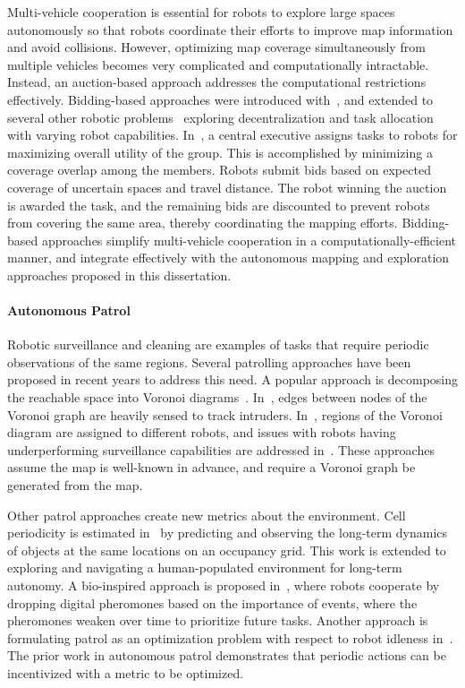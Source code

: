 \documentclass[thesis]{thesis-gwu}
\begin{document}
Multi-vehicle cooperation is essential for robots to explore large spaces autonomously so that robots coordinate their efforts to improve map information and avoid collisions. However, optimizing map coverage simultaneously from multiple vehicles becomes very complicated and computationally intractable. Instead, an auction-based approach addresses the computational restrictions effectively. Bidding-based approaches were introduced with~\cite{SimApfBurFoxMooThrYou00,DiaSte00}, and extended to several other robotic problems~\cite{GerMaj02,ZloSteDiaTha02,SarBal05,ChoBruHow09} exploring decentralization and task allocation with varying robot capabilities. In~\cite{SimApfBurFoxMooThrYou00}, a central executive assigns tasks to robots for maximizing overall utility of the group. This is accomplished by minimizing a coverage overlap among the members. Robots submit bids based on expected coverage of uncertain spaces and travel distance. The robot winning the auction is awarded the task, and the remaining bids are discounted to prevent robots from covering the same area, thereby coordinating the mapping efforts. Bidding-based approaches simplify multi-vehicle cooperation in a computationally-efficient manner, and integrate effectively with the autonomous mapping and exploration approaches proposed in this dissertation. 

\paragraph{Autonomous Patrol}

Robotic surveillance and cleaning are examples of tasks that require periodic observations of the same regions. Several patrolling approaches have been proposed in recent years to address this need. A popular approach is decomposing the reachable space into Voronoi diagrams~\cite{KolCar08,PorRoc10,PipChrWei13}. In~\cite{KolCar08}, edges between nodes of the Voronoi graph are heavily sensed to track intruders. In~\cite{PorRoc10}, regions of the Voronoi diagram are assigned to different robots, and issues with robots having underperforming surveillance capabilities are addressed in~\cite{PipChrWei13}. These approaches assume the map is well-known in advance, and require a Voronoi graph be generated from the map.

Other patrol approaches create new metrics about the environment. Cell periodicity is estimated in~\cite{KraFenCieDonDuc14,KraFenHanDuc16} by predicting and observing the long-term dynamics of objects at the same locations on an occupancy grid. This work is extended to exploring and navigating a human-populated environment for long-term autonomy. A bio-inspired approach is proposed in~\cite{ZhaXia11}, where robots cooperate by dropping digital pheromones based on the importance of events, where the pheromones weaken over time to prioritize future tasks. Another approach is formulating patrol as an optimization problem with respect to robot idleness in~\cite{YanZha16}. The prior work in autonomous patrol demonstrates that periodic actions can be incentivized with a metric to be optimized.
\end{document}
